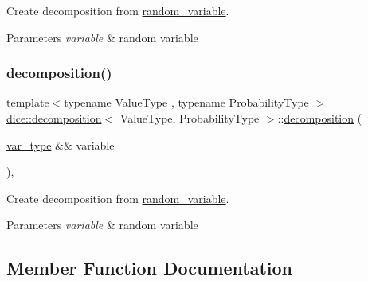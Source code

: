 Create decomposition from \mbox{\hyperlink{classdice_1_1random__variable}{random\+\_\+variable}}. 


\begin{DoxyParams}{Parameters}
{\em variable} & random variable \\
\hline
\end{DoxyParams}
\mbox{\label{classdice_1_1decomposition_a1c0f335542198fe9f6ca6d0a0c2a4de0}} 
\subsubsection{\texorpdfstring{decomposition()}{decomposition()}\hspace{0.1cm}{\footnotesize\ttfamily [2/2]}}
{\footnotesize\ttfamily template$<$typename Value\+Type , typename Probability\+Type $>$ \\
\mbox{\hyperlink{classdice_1_1decomposition}{dice\+::decomposition}}$<$ Value\+Type, Probability\+Type $>$\+::\mbox{\hyperlink{classdice_1_1decomposition}{decomposition}} (\begin{DoxyParamCaption}\item[{\mbox{\hyperlink{classdice_1_1random__variable}{var\+\_\+type}} \&\&}]{variable }\end{DoxyParamCaption})\hspace{0.3cm}{\ttfamily [inline]}, {\ttfamily [explicit]}}



Create decomposition from \mbox{\hyperlink{classdice_1_1random__variable}{random\+\_\+variable}}. 


\begin{DoxyParams}{Parameters}
{\em variable} & random variable \\
\hline
\end{DoxyParams}


\subsection{Member Function Documentation}
\mbox{\label{classdice_1_1decomposition_a323d8d184660b6e8751970002ae850a7}} 
